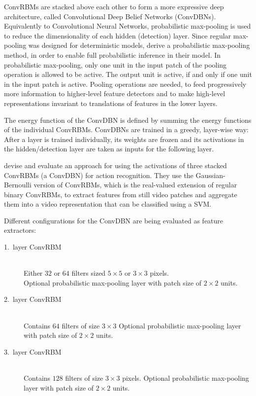 ConvRBMs are stacked above each other to form a more expressive deep architecture, called Convolutional Deep Belief Networks (ConvDBNs).
Equivalently to Convolutional Neural Networks, probabilistic max-pooling is used to reduce the dimensionality of each hidden (detection) layer.
Since regular max-pooling was designed for deterministic models, \textcite{lee_convolutional_2009-1} derive a probabilistic max-pooling method, in order to enable full probabilistic inference in their model.
In probabilistic max-pooling, only one unit in the input patch of the pooling operation is allowed to be active.
The output unit is active, if and only if one unit in the input patch is active.
Pooling operations are needed, to feed progressively more information to higher-level feature detectors and to make high-level representations invariant to translations of features in the lower layers. \cite{lee_convolutional_2009-1}

The energy function of the ConvDBN is defined by summing the energy functions of the individual ConvRBMs.
ConvDBNs are trained in a greedy, layer-wise way: After a layer is trained individually, its weights are frozen and its activations in the hidden/detection layer are taken as inputs for the following layer.
\cite{lee_convolutional_2009-1}

\textcite{palasek_action_2016} devise and evaluate an approach for using the activations of three stacked ConvRBMs (a ConvDBN) for action recognition.
They use the Gaussian-Bernoulli version of ConvRBMs, which is the real-valued extension of regular binary ConvRBMs, to extract features from still video patches and aggregate them into a video representation that can be classified using a SVM.

Different configurations for the ConvDBN are being evaluated as feature extractors:
\begin{description}
    \item[1.\ layer ConvRBM] \hfill \\
        Either $32$ or $64$ filters sized $5 \times 5$ or $3 \times 3$ pixels.\\
        Optional probabilistic max-pooling layer with patch size of $2 \times 2$ units.
    \item[2.\ layer ConvRBM] \hfill \\
        Contains $64$ filters of size $3 \times 3$
        Optional probabilistic max-pooling layer with patch size of $2 \times 2$ units.
    \item[3.\ layer ConvRBM] \hfill \\
        Contains $128$ filters of size $3 \times 3$ pixels.
        Optional probabilistic max-pooling layer with patch size of $2 \times 2$ units.
\end{description}

